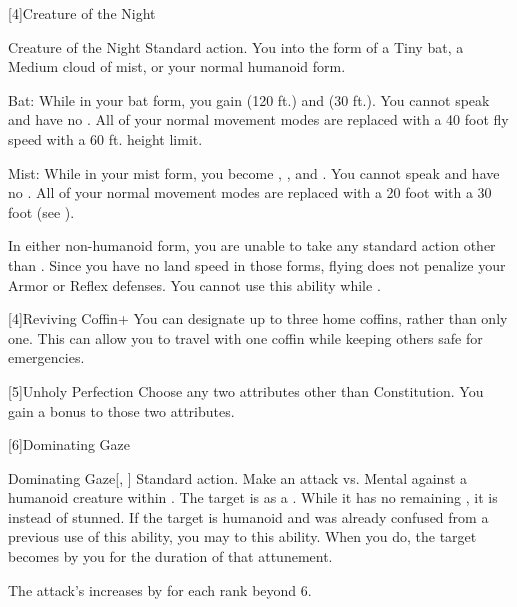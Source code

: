     [4]{Creature of the Night}
      \begin{magicalattuneability}{Creature of the Night}{}
        \abilityusagetime Standard action.
        \rankline
        You  into the form of a Tiny bat, a Medium cloud of mist, or your normal humanoid form.
        \begin{raggeditemize}
          \item Bat: While in your bat form, you gain  (120 ft.) and  (30 ft.).
            You cannot speak and have no .
            All of your normal movement modes are replaced with a 40 foot fly speed with a 60 ft. height limit.
          \item Mist: While in your mist form, you become , , and .
            You cannot speak and have no .
            All of your normal movement modes are replaced with a 20 foot  with a 30 foot  (see ).
        \end{raggeditemize}

        In either non-humanoid form, you are unable to take any standard action other than .
        Since you have no land speed in those forms, flying does not penalize your Armor or Reflex defenses.
        You cannot use this ability while \paralyzed.
      \end{magicalattuneability}

    [4]{Reviving Coffin+} You can designate up to three home coffins, rather than only one.
      This can allow you to travel with one coffin while keeping others safe for emergencies.

    [5]{Unholy Perfection} Choose any two attributes other than Constitution.
      You gain a  bonus to those two attributes.

    [6]{Dominating Gaze}
      \begin{magicalactiveability}{Dominating Gaze}[, ]
        \abilityusagetime Standard action.
        \rankline
        Make an attack vs. Mental against a humanoid creature within \shortrange.
        \hit The target is \stunned as a .
        While it has no remaining , it is \confused instead of stunned.
        \crit If the target is humanoid and was already confused from a previous use of this ability, you may  to this ability.
        When you do, the target becomes \dominated by you for the duration of that attunement.

        \rankline
        The attack's  increases by  for each rank beyond 6.
      \end{magicalactiveability}

